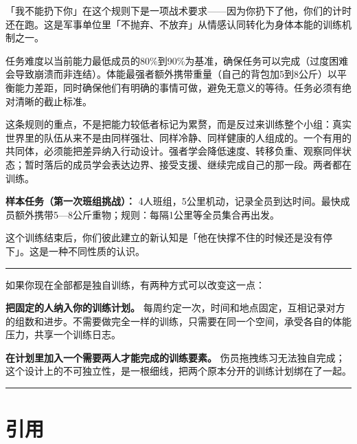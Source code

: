 \documentclass[UTF8,zihao=-4,oneside]{ctexart}
\newcommand{\BookMinorTitle}[1]{%
  \par\vspace{0.35em}{\sffamily\large\bfseries\color{TitleInk}#1}\par\vspace{0.15em}%
}
\begin{document}
「我不能扔下你」在这个规则下是一项战术要求——因为你扔下了他，你们的计时还在跑。这是军事单位里「不抛弃、不放弃」从情感认同转化为身体本能的训练机制之一。

\BookMinorTitle{设计参数}
任务难度以当前能力最低成员的80\%到90\%为基准，确保任务可以完成（过度困难会导致崩溃而非连结）。体能最强者额外携带重量（自己的背包加5到8公斤）以平衡能力差距，同时确保他们有明确的事情可做，避免无意义的等待。任务必须有绝对清晰的截止标准。

这条规则的重点，不是把能力较低者标记为累赘，而是反过来训练整个小组：真实世界里的队伍从来不是由同样强壮、同样冷静、同样健康的人组成的。一个有用的共同体，必须能把差异纳入行动设计。强者学会降低速度、转移负重、观察同伴状态；暂时落后的成员学会表达边界、接受支援、继续完成自己的那一段。两者都在训练。

\begin{BookCallout}[colback=greenBack,colframe=greenLine,overlay={\node[CalloutLabel,fill=greenTag] at ([xshift=3.5mm,yshift=-0.4mm]frame.north west) {行动};}]
\textbf{样本任务（第一次班组挑战）：}
\vspace{0.15em}
4人班组，5公里机动，记录全员到达时间。最快成员额外携带5—8公斤重物；规则：每隔1公里等全员集合再出发。
\end{BookCallout}

这个训练结束后，你们彼此建立的新认知是「他在快撑不住的时候还是没有停下」。这是一种不同性质的认识。

\vspace{0.35em}\noindent\textcolor{RuleInk}{\rule{\linewidth}{0.35pt}}\vspace{0.35em}

\BookMinorTitle{两个起点}

如果你现在全部都是独自训练，有两种方式可以改变这一点：

\textbf{把固定的人纳入你的训练计划。} 每周约定一次，时间和地点固定，互相记录对方的组数和进步。不需要做完全一样的训练，只需要在同一个空间，承受各自的体能压力，共享一个训练日志。

\textbf{在计划里加入一个需要两人才能完成的训练要素。} 伤员拖拽练习无法独自完成；这个设计上的不可独立性，是一根细线，把两个原本分开的训练计划绑在了一起。

\vspace{0.35em}\noindent\textcolor{RuleInk}{\rule{\linewidth}{0.35pt}}\vspace{0.35em}

\section*{引用}
\footnotesize{}\setlength{\parskip}{0.06em}
\end{document}
